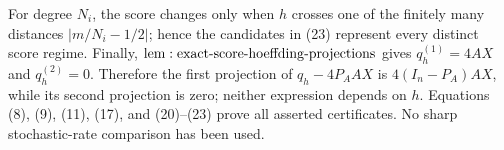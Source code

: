For degree \(N_i\), the score changes only when \(h\) crosses one of the finitely many distances \(|m/N_i-1/2|\); hence the candidates in (23) represent every distinct score regime.  Finally, \({\rm lem:exact\text{-}score\text{-}hoeffding\text{-}projections}\) gives \(q_h^{(1)}=4AX\) and \(q_h^{(2)}=0\).  Therefore the first projection of \(q_h-4P_AAX\) is \(4(I_n-P_A)AX\), while its second projection is zero; neither expression depends on \(h\).  Equations (8), (9), (11), (17), and (20)--(23) prove all asserted certificates.  No sharp stochastic-rate comparison has been used.